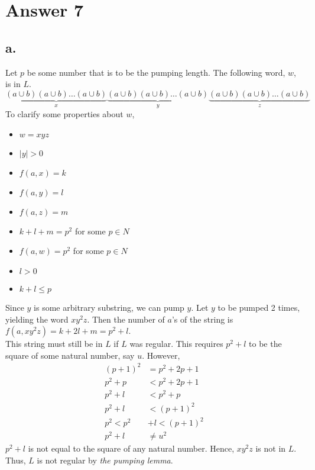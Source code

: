 \documentclass[12pt]{article}
\begin{document}
\section*{Answer 7}
\subsection*{a.}
Let $p$ be some number that is to be the pumping length. The following word, $w$, is in $L$.
\[
\underbrace{(a\cup b)(a\cup b)\dots(a\cup b)}_x\underbrace{(a\cup b)(a\cup b)\dots(a\cup b)}_y\underbrace{(a\cup b)(a\cup b)\dots(a\cup b)}_z
\]
To clarify some properties about $w$,
\begin{itemize}
    \item $w=xyz$
    \item $|y| > 0$
    \item $f(a,x)=k$
    \item $f(a,y)=l$
    \item $f(a,z)=m$
    \item $k+l+m=p^2$ for some $p\in N$
    \item $f(a,w)=p^2$ for some $p \in N$
    \item $l > 0$
    \item $k+l\le p$
\end{itemize}
Since $y$ is some arbitrary substring, we can pump $y$. Let $y$ to be pumped 2 times, yielding the word $xy^2z$. Then the number of $a$'s of the string is $f(a,xy^2z)=k+2l+m=p^2+l$.\\
This string must still be in $L$ if $L$ was regular. This requires $p^2+l$ to be the square of some natural number, say $u$. However,
\begin{align*}
    (p+1)^2&=p^2+2p+1\\
    p^2+p&<p^2+2p+1\\
    p^2+l&<p^2+p\\
    p^2+l&<(p+1)^2\\
    p^2<p^2&+l<(p+1)^2\\
    p^2+l&\neq u^2
\end{align*}
$p^2+l$ is not equal to the square of any natural number. Hence, $xy^2z$ is not in $L$. Thus, $L$ is not regular by \textit{the pumping lemma}.
\end{document}
